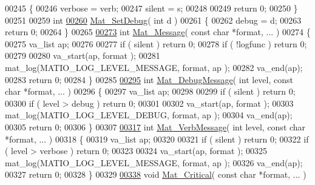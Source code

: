 \begin{DoxyCode}
{{{{{{{{{{{{{{00245 \{
00246     verbose = verb;
00247     silent  = s;
00248 
00249     \textcolor{keywordflow}{return} 0;
00250 \}
00251 
00259 \textcolor{keywordtype}{int}
\hyperlink{group__mat__util_gad75e2962dcaf2ac366f2420bb5b13094}{00260} \hyperlink{group__mat__util_gad75e2962dcaf2ac366f2420bb5b13094}{Mat\_SetDebug}( \textcolor{keywordtype}{int} d )
00261 \{
00262     debug = d;
00263     \textcolor{keywordflow}{return} 0;
00264 \}
00265 
\hyperlink{group__mat__util_gae7dfa394b111bc908a616f8f5bddaa97}{00273} \textcolor{keywordtype}{int} \hyperlink{group__mat__util_gae7dfa394b111bc908a616f8f5bddaa97}{Mat\_Message}( \textcolor{keyword}{const} \textcolor{keywordtype}{char} *format, ... )
00274 \{
00275     va\_list ap;
00276 
00277     \textcolor{keywordflow}{if} ( silent ) \textcolor{keywordflow}{return} 0;
00278     \textcolor{keywordflow}{if} ( !logfunc ) \textcolor{keywordflow}{return} 0;
00279 
00280     va\_start(ap, format );
00281     mat\_log(MATIO\_LOG\_LEVEL\_MESSAGE, format, ap );
00282     va\_end(ap);
00283     \textcolor{keywordflow}{return} 0;
00284 \}
00285 
\hyperlink{group__mat__util_ga26e00cfb07551be5201fd9e0f04066d9}{00295} \textcolor{keywordtype}{int} \hyperlink{group__mat__util_ga26e00cfb07551be5201fd9e0f04066d9}{Mat\_DebugMessage}( \textcolor{keywordtype}{int} level, \textcolor{keyword}{const} \textcolor{keywordtype}{char} *format, ... )
00296 \{
00297     va\_list ap;
00298 
00299     \textcolor{keywordflow}{if} ( silent ) \textcolor{keywordflow}{return} 0;
00300     \textcolor{keywordflow}{if} ( level > debug ) \textcolor{keywordflow}{return} 0;
00301 
00302     va\_start(ap, format );
00303     mat\_log(MATIO\_LOG\_LEVEL\_DEBUG, format, ap );
00304     va\_end(ap);
00305     \textcolor{keywordflow}{return} 0;
00306 \}
00307 
\hyperlink{group__mat__util_ga64a176ea7e27e38d4242a24f3e3bad24}{00317} \textcolor{keywordtype}{int} \hyperlink{group__mat__util_ga64a176ea7e27e38d4242a24f3e3bad24}{Mat\_VerbMessage}( \textcolor{keywordtype}{int} level, \textcolor{keyword}{const} \textcolor{keywordtype}{char} *format, ... )
00318 \{
00319     va\_list ap;
00320 
00321     \textcolor{keywordflow}{if} ( silent ) \textcolor{keywordflow}{return} 0;
00322     \textcolor{keywordflow}{if} ( level > verbose ) \textcolor{keywordflow}{return} 0;
00323 
00324     va\_start(ap, format );
00325     mat\_log(MATIO\_LOG\_LEVEL\_MESSAGE, format, ap );
00326     va\_end(ap);
00327     \textcolor{keywordflow}{return} 0;
00328 \}
00329 
\hyperlink{group__mat__util_gaf51f2bfbb5580f575e4dd79757e2b80c}{00338} \textcolor{keywordtype}{void} \hyperlink{group__mat__util_gaf51f2bfbb5580f575e4dd79757e2b80c}{Mat\_Critical}( \textcolor{keyword}{const} \textcolor{keywordtype}{char} *format, ... )
}}}}}}}}}}}}}}
\end{DoxyCode}
